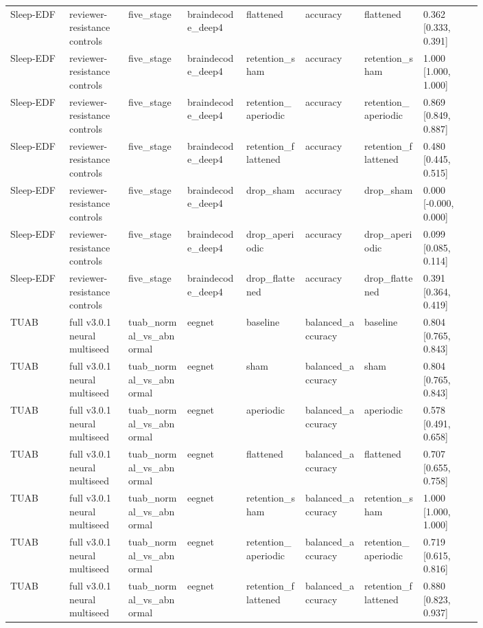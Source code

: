 \begin{longtable}{p{0.10\linewidth}p{0.10\linewidth}p{0.10\linewidth}p{0.10\linewidth}p{0.10\linewidth}p{0.10\linewidth}p{0.10\linewidth}p{0.10\linewidth}}
Sleep-EDF & reviewer-resistance controls & five\_stage & braindecode\_deep4 & flattened & accuracy & flattened & 0.362 [0.333, 0.391]\\
Sleep-EDF & reviewer-resistance controls & five\_stage & braindecode\_deep4 & retention\_sham & accuracy & retention\_sham & 1.000 [1.000, 1.000]\\
Sleep-EDF & reviewer-resistance controls & five\_stage & braindecode\_deep4 & retention\_aperiodic & accuracy & retention\_aperiodic & 0.869 [0.849, 0.887]\\
Sleep-EDF & reviewer-resistance controls & five\_stage & braindecode\_deep4 & retention\_flattened & accuracy & retention\_flattened & 0.480 [0.445, 0.515]\\
Sleep-EDF & reviewer-resistance controls & five\_stage & braindecode\_deep4 & drop\_sham & accuracy & drop\_sham & 0.000 [-0.000, 0.000]\\
Sleep-EDF & reviewer-resistance controls & five\_stage & braindecode\_deep4 & drop\_aperiodic & accuracy & drop\_aperiodic & 0.099 [0.085, 0.114]\\
Sleep-EDF & reviewer-resistance controls & five\_stage & braindecode\_deep4 & drop\_flattened & accuracy & drop\_flattened & 0.391 [0.364, 0.419]\\
TUAB & full v3.0.1 neural multiseed & tuab\_normal\_vs\_abnormal & eegnet & baseline & balanced\_accuracy & baseline & 0.804 [0.765, 0.843]\\
TUAB & full v3.0.1 neural multiseed & tuab\_normal\_vs\_abnormal & eegnet & sham & balanced\_accuracy & sham & 0.804 [0.765, 0.843]\\
TUAB & full v3.0.1 neural multiseed & tuab\_normal\_vs\_abnormal & eegnet & aperiodic & balanced\_accuracy & aperiodic & 0.578 [0.491, 0.658]\\
TUAB & full v3.0.1 neural multiseed & tuab\_normal\_vs\_abnormal & eegnet & flattened & balanced\_accuracy & flattened & 0.707 [0.655, 0.758]\\
TUAB & full v3.0.1 neural multiseed & tuab\_normal\_vs\_abnormal & eegnet & retention\_sham & balanced\_accuracy & retention\_sham & 1.000 [1.000, 1.000]\\
TUAB & full v3.0.1 neural multiseed & tuab\_normal\_vs\_abnormal & eegnet & retention\_aperiodic & balanced\_accuracy & retention\_aperiodic & 0.719 [0.615, 0.816]\\
TUAB & full v3.0.1 neural multiseed & tuab\_normal\_vs\_abnormal & eegnet & retention\_flattened & balanced\_accuracy & retention\_flattened & 0.880 [0.823, 0.937]\\

\end{longtable}
